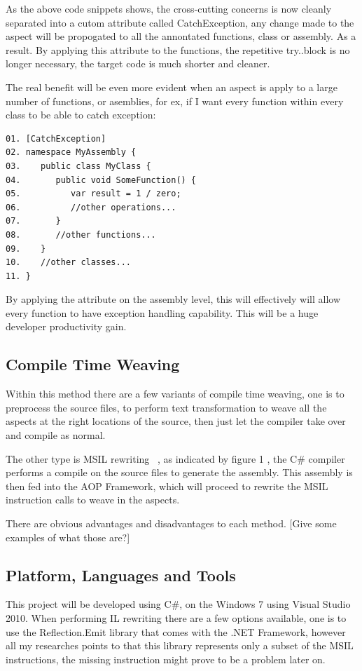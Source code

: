 As the above code snippets shows, the cross-cutting concerns is now cleanly separated into a cutom attribute called CatchException, any change made to the aspect will be propogated to all the annontated functions, class or assembly. As a result. By applying this attribute to the functions, the repetitive try..block is no longer necessary, the target code is much shorter and cleaner. 

The real benefit will be even more evident when an aspect is apply to a large number of functions, or asemblies, for ex, if I want every function within every class to be able to catch exception:

\begin{verbatim}
01. [CatchException]
02. namespace MyAssembly {
03.    public class MyClass {
04.       public void SomeFunction() {
05.          var result = 1 / zero;
06.          //other operations...
07.       }
08.       //other functions...
09.    }
10.    //other classes...
11. }
\end{verbatim}

By applying the attribute on the assembly level, this will effectively will allow every function to have exception handling capability. This will be a huge developer productivity gain.


\subsection{Compile Time Weaving}
Within this method there are a few variants of compile time weaving, one is to preprocess the source files, to perform text transformation to weave all the aspects at the right locations of the source, then just let the compiler take over and compile as normal.

The other type is MSIL rewriting ~\cite{rewrite_msil}, as indicated by figure 1 , the C\# compiler performs a compile on the source files to generate the assembly. This assembly is then fed into the AOP Framework, which will proceed to rewrite the MSIL instruction calls to weave in the aspects.

There are obvious advantages and disadvantages to each method. [Give some examples of what those are?]

\subsection{Platform, Languages and Tools}
This project will be developed using C\#, on the Windows 7 using Visual Studio 2010. When performing IL rewriting there are a few options available, one is to use the Reflection.Emit library that comes with the .NET Framework, however all my researches points to that this library represents only a subset of the MSIL instructions, the missing instruction might prove to be a problem later on.

